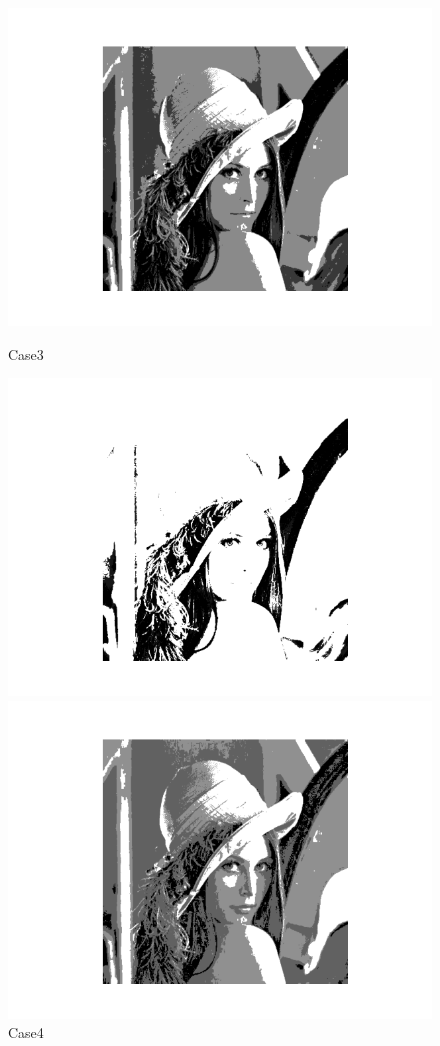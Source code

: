 \documentclass{article}
\begin{document}
\begin{figure}[h]
\begin{minipage}[t]{0.2\textwidth}
		\includegraphics[width=\textwidth]{GA_3.png}
		\caption{Case3}
	\end{minipage}
	\begin{minipage}[t]{0.2\textwidth}
		\centering
		\includegraphics[width=\textwidth]{GA_4.png}
		\caption{Case4}
	\end{minipage}
	\begin{minipage}[t]{0.2\textwidth}
		\centering
		\includegraphics[width=\textwidth]{GA_5.png}

\end{minipage}
\end{figure}
\end{document}
